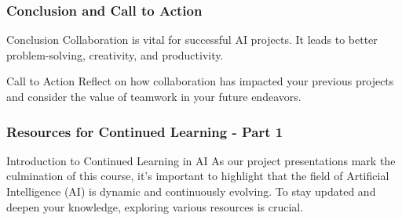 \documentclass[aspectratio=169]{beamer}
\begin{document}
\begin{frame}[fragile]
    \frametitle{Conclusion and Call to Action}
    \begin{block}{Conclusion}
        Collaboration is vital for successful AI projects. It leads to better problem-solving, creativity, and productivity.
    \end{block}
    
    \begin{block}{Call to Action}
        Reflect on how collaboration has impacted your previous projects and consider the value of teamwork in your future endeavors.
    \end{block}
\end{frame}

\begin{frame}[fragile]
    \frametitle{Resources for Continued Learning - Part 1}
    \begin{block}{Introduction to Continued Learning in AI}
        As our project presentations mark the culmination of this course, it’s important to highlight that the field of Artificial Intelligence (AI) is dynamic and continuously evolving. To stay updated and deepen your knowledge, exploring various resources is crucial.
    \end{block}
\end{frame}
\end{document}
